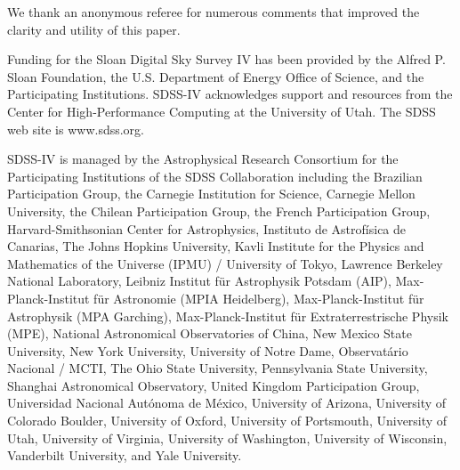 We thank an anonymous referee for numerous comments that improved the
clarity and utility of this paper. 

Funding for the Sloan Digital Sky Survey IV has been provided by the
Alfred P. Sloan Foundation, the U.S. Department of Energy Office of
Science, and the Participating Institutions. SDSS-IV acknowledges
support and resources from the Center for High-Performance Computing
at the University of Utah. The SDSS web site is www.sdss.org.

SDSS-IV is managed by the Astrophysical Research Consortium for the
Participating Institutions of the SDSS Collaboration including the
Brazilian Participation Group, the Carnegie Institution for Science,
Carnegie Mellon University, the Chilean Participation Group, the
French Participation Group, Harvard-Smithsonian Center for
Astrophysics, Instituto de Astrof\'isica de Canarias, The Johns
Hopkins University, Kavli Institute for the Physics and Mathematics of
the Universe (IPMU) / University of Tokyo, Lawrence Berkeley National
Laboratory, Leibniz Institut f\"ur Astrophysik Potsdam (AIP),
Max-Planck-Institut f\"ur Astronomie (MPIA Heidelberg),
Max-Planck-Institut f\"ur Astrophysik (MPA Garching),
Max-Planck-Institut f\"ur Extraterrestrische Physik (MPE), National
Astronomical Observatories of China, New Mexico State University, New
York University, University of Notre Dame, Observat\'ario Nacional /
MCTI, The Ohio State University, Pennsylvania State University,
Shanghai Astronomical Observatory, United Kingdom Participation Group,
Universidad Nacional Aut\'onoma de M\'exico, University of Arizona,
University of Colorado Boulder, University of Oxford, University of
Portsmouth, University of Utah, University of Virginia, University of
Washington, University of Wisconsin, Vanderbilt University, and Yale
University.

